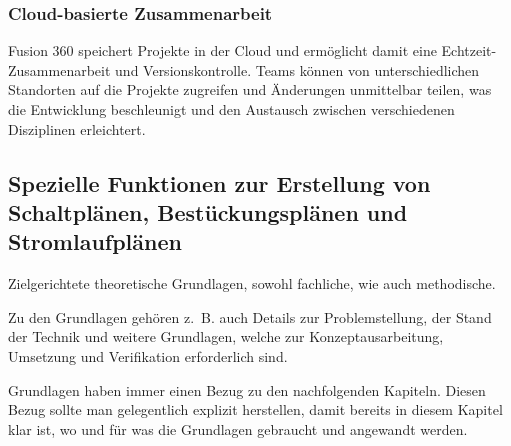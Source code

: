 \subsubsection*{Cloud-basierte Zusammenarbeit}
Fusion 360 speichert Projekte in der Cloud und ermöglicht damit eine Echtzeit-Zusammenarbeit und Versionskontrolle. Teams können von unterschiedlichen Standorten auf die Projekte zugreifen und Änderungen unmittelbar teilen, was die Entwicklung beschleunigt und den Austausch zwischen verschiedenen Disziplinen erleichtert.\autocite{cideon_fusion360_vorteile}
\subsection{Spezielle Funktionen zur Erstellung von Schaltplänen, Bestückungsplänen und Stromlaufplänen}


Zielgerichtete theoretische Grundlagen, sowohl fachliche, wie auch methodische.

Zu den Grundlagen gehören z.~B. auch Details zur Problemstellung, der Stand der Technik und weitere Grundlagen, welche zur Konzeptausarbeitung, Umsetzung und Verifikation erforderlich sind.

Grundlagen haben immer einen Bezug zu den nachfolgenden Kapiteln. Diesen Bezug sollte man gelegentlich explizit herstellen, damit bereits in diesem Kapitel klar ist, wo und für was die Grundlagen gebraucht und angewandt werden.